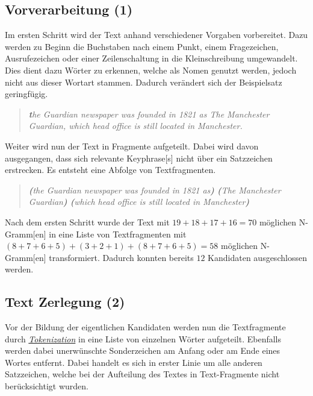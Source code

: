 
\subsection{Vorverarbeitung (1)}


Im ersten Schritt wird der Text anhand verschiedener Vorgaben vorbereitet. Dazu werden zu Beginn die Buchstaben nach einem Punkt, einem Fragezeichen, Ausrufezeichen oder einer Zeilenschaltung in die Kleinschreibung umgewandelt. Dies dient dazu Wörter zu erkennen, welche als Nomen genutzt werden, jedoch nicht aus dieser Wortart stammen. Dadurch verändert sich der Beispielsatz geringfügig. 

\begin{quote}
\textit{\textbf{t}he Guardian newspaper was founded in 1821 as \glqq The Manchester Guardian\grqq, which head office is still located in Manchester.}
\end{quote}

Weiter wird nun der Text in Fragmente aufgeteilt. Dabei wird davon ausgegangen, dass sich relevante \gls{Keyphrase}[s] nicht über ein Satzzeichen erstrecken. Es entsteht eine Abfolge von Textfragmenten.
\begin{quote}
\textit{\textbf{(}the Guardian newspaper was founded in 1821 as\textbf{)} \textbf{(}The Manchester Guardian\textbf{)} \textbf{(}which head office is still located in Manchester\textbf{)}}
\end{quote}
Nach dem ersten Schritt wurde der Text mit $19+18+17+16=70$ möglichen \gls{N-Gramm}[en] in eine Liste von Textfragmenten mit $(8+7+6+5)+(3+2+1)+(8+7+6+5)=58$ möglichen \gls{N-Gramm}[en] transformiert. Dadurch konnten bereits $12$ Kandidaten ausgeschlossen werden.


\subsection{Text Zerlegung (2)}


Vor der Bildung der eigentlichen Kandidaten werden nun die Textfragmente durch \hyperref[tokenization]{\textit{Tokenization}} in eine Liste von einzelnen Wörter aufgeteilt. Ebenfalls werden dabei unerwünschte Sonderzeichen am Anfang oder am Ende eines Wortes entfernt. Dabei handelt es sich in erster Linie um alle anderen Satzzeichen, welche bei der Aufteilung des Textes in Text-Fragmente nicht berücksichtigt wurden.

